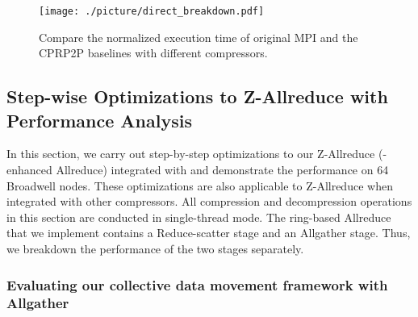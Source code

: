 \begin{figure}[ht]
    \centering
    {\texttt{[image: ./picture/direct\_breakdown.pdf]}}
    \caption{Compare the normalized execution time of original MPI and the CPRP2P baselines with different compressors.} 
    \label{fig-original-naive}
\end{figure}
\subsection{Step-wise Optimizations to Z-Allreduce with Performance Analysis}
\label{sec:evaluation}
In this section, we carry out step-by-step optimizations to our Z-Allreduce ({\pname}-enhanced Allreduce) integrated with {\fzlight} and demonstrate the performance on 64 Broadwell nodes. These optimizations are also applicable to Z-Allreduce when integrated with other compressors. All compression and decompression operations in this section are conducted in single-thread mode. The ring-based Allreduce that we implement contains a Reduce-scatter stage and an Allgather stage. Thus, we breakdown the performance of the two stages separately.



\subsubsection{Evaluating our collective data movement framework with Allgather}
\label{sec:eval-framework}


